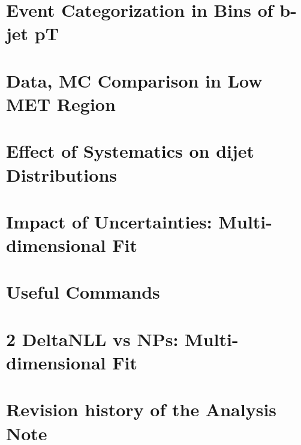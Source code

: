 %

\section{Event Categorization in Bins of b-jet pT}

\label{a:appendBjetPtCat}

\section{Data, MC Comparison in Low MET Region}

\label{a:appendLowMET}

\newpage
\section{Effect of Systematics on dijet Distributions}

\label{a:appendSysMjj}

\section{Impact of Uncertainties: Multi-dimensional Fit}

\label{s:secNuisImpact}

\newpage
\section{Useful Commands}

\label{a:appendCommand}

\newpage
\section{2 DeltaNLL vs NPs: Multi-dimensional Fit}

\label{a:appendScanNuis}
\newpage
\section{Revision history of the Analysis Note}
\label{s:secChanges}

